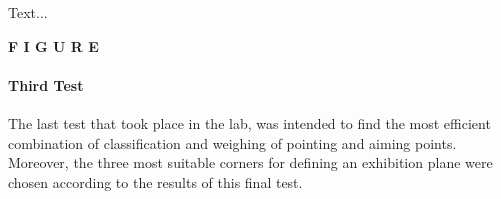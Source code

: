Text...

\textbf{F I G U R E}

\paragraph{Third Test} The last test that took place in the lab, was intended to find the most efficient combination of classification and weighing of pointing and aiming points. Moreover, the three most suitable corners for defining an exhibition plane were chosen according to the results of this final test.

